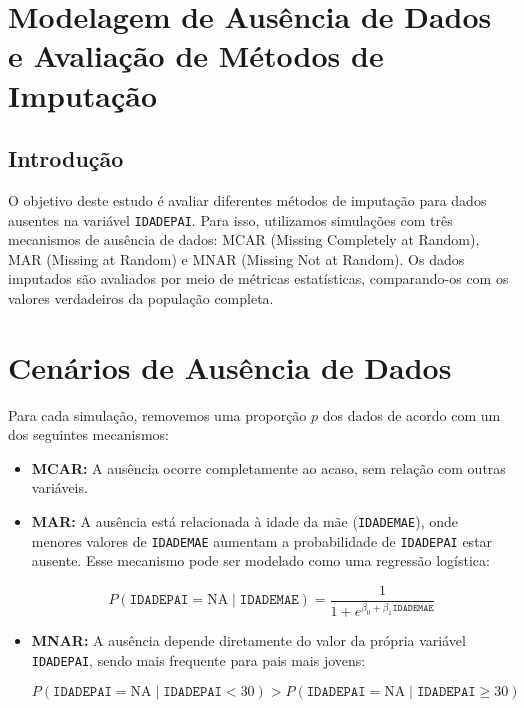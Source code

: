 \documentclass{article}
\begin{document}
\section{Modelagem de Ausência de Dados e Avaliação de Métodos de Imputação}
\subsection{Introdução}

O objetivo deste estudo é avaliar diferentes métodos de imputação para dados ausentes na variável \texttt{IDADEPAI}. Para isso, utilizamos simulações com três mecanismos de ausência de dados: MCAR (Missing Completely at Random), MAR (Missing at Random) e MNAR (Missing Not at Random). Os dados imputados são avaliados por meio de métricas estatísticas, comparando-os com os valores verdadeiros da população completa.

\section{Cenários de Ausência de Dados}

Para cada simulação, removemos uma proporção \( p \) dos dados de acordo com um dos seguintes mecanismos:

\begin{itemize}
    \item \textbf{MCAR:} A ausência ocorre completamente ao acaso, sem relação com outras variáveis.
    \item \textbf{MAR:} A ausência está relacionada à idade da mãe (\texttt{IDADEMAE}), onde menores valores de \texttt{IDADEMAE} aumentam a probabilidade de \texttt{IDADEPAI} estar ausente. Esse mecanismo pode ser modelado como uma regressão logística:

    \begin{equation}
        P(\texttt{IDADEPAI} = \text{NA} \mid \texttt{IDADEMAE}) = \frac{1}{1 + e^{\beta_0 + \beta_1 \texttt{IDADEMAE}}}
    \end{equation}

    \item \textbf{MNAR:} A ausência depende diretamente do valor da própria variável \texttt{IDADEPAI}, sendo mais frequente para pais mais jovens:

    \begin{equation}
        P(\texttt{IDADEPAI} = \text{NA} \mid \texttt{IDADEPAI} < 30) > P(\texttt{IDADEPAI} = \text{NA} \mid \texttt{IDADEPAI} \geq 30)
    \end{equation}
\end{itemize}
\end{document}
